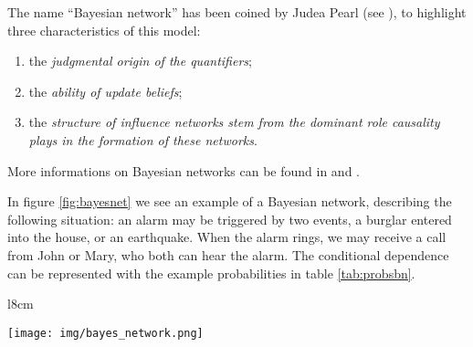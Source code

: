 The name ``Bayesian network'' has been coined by Judea Pearl (see \cite{pearl1985bayesian}), to highlight three characteristics of this model:

\begin{enumerate}[noitemsep]
  \item the \textit{judgmental origin of the quantifiers};
  \item the \textit{ability of update beliefs};
  \item the \textit{structure of influence networks stem from the dominant role \textit{causality} plays in the formation of these networks}.
\end{enumerate}

More informations on Bayesian networks can be found in \cite{mitchell2005draft} and \cite{bayestheorytool}.

In figure \ref{fig:bayesnet} we see an example of a Bayesian network, describing the following situation: an alarm may be triggered by two events, a burglar entered into the house, or an earthquake. When the alarm rings, we may receive a call from John or Mary, who both can hear the alarm. The conditional dependence can be represented with the example probabilities in table \ref{tab:probsbn}.

\begin{wrapfigure}{l}{8cm}
  \begin{center}
    \texttt{[image: img/bayes\_network.png]}
    \caption{An example of a Bayesian network.}
    \label{fig:bayesnet}
  \end{center}
\end{wrapfigure}

